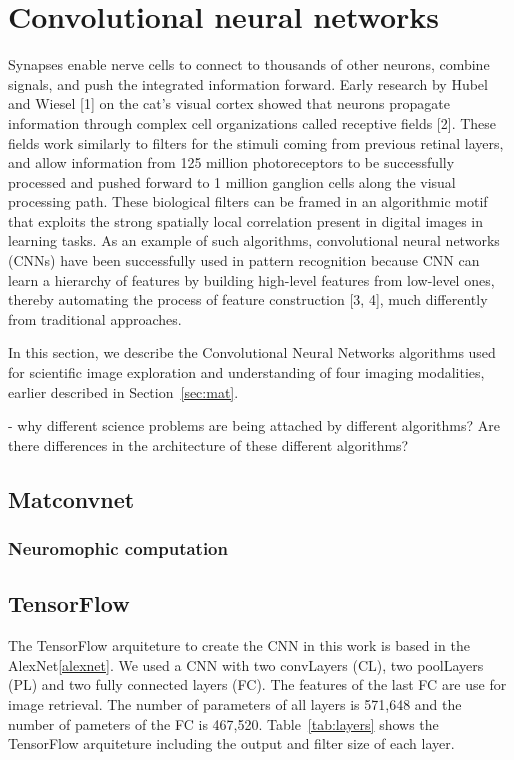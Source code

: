 \section{Convolutional neural networks}\label{sec:met}
Synapses enable nerve cells to connect to thousands of other neurons, combine signals, and push the integrated information forward. Early research by Hubel and Wiesel [1] on the cat’s visual cortex showed that neurons propagate information through complex cell organizations called receptive fields [2]. These fields work similarly to filters for the stimuli coming from previous retinal layers, and allow information from 125 million photoreceptors to be successfully processed and pushed forward to 1 million ganglion cells along the visual processing path. These biological filters can be framed in an algorithmic motif that exploits the strong spatially local correlation present in digital images in learning tasks. As an example of such algorithms, convolutional neural networks (CNNs) have been successfully used in pattern recognition because CNN can learn a hierarchy of features by building high-level features from low-level ones, thereby automating the process of feature construction [3, 4], much differently from traditional approaches.

In this section, we describe the Convolutional Neural Networks algorithms used for scientific image exploration and understanding of four imaging modalities, earlier described in Section~\ref{sec:mat}.

- why different science problems are being attached by different algorithms? Are there differences in the architecture of these different algorithms?


\subsection{Matconvnet}

\subsubsection{Neuromophic computation}

\subsection{TensorFlow}

The TensorFlow arquiteture to create the CNN in this work is based in the AlexNet\ref{alexnet}.  We used a CNN with two convLayers (CL), two poolLayers (PL) and two fully connected layers (FC). The features of the last FC are use for image retrieval. The number of parameters of all layers is 571,648 and the number of pameters of the FC is 467,520. Table~\ref{tab:layers} shows the TensorFlow arquiteture including the output and filter size of each layer.

